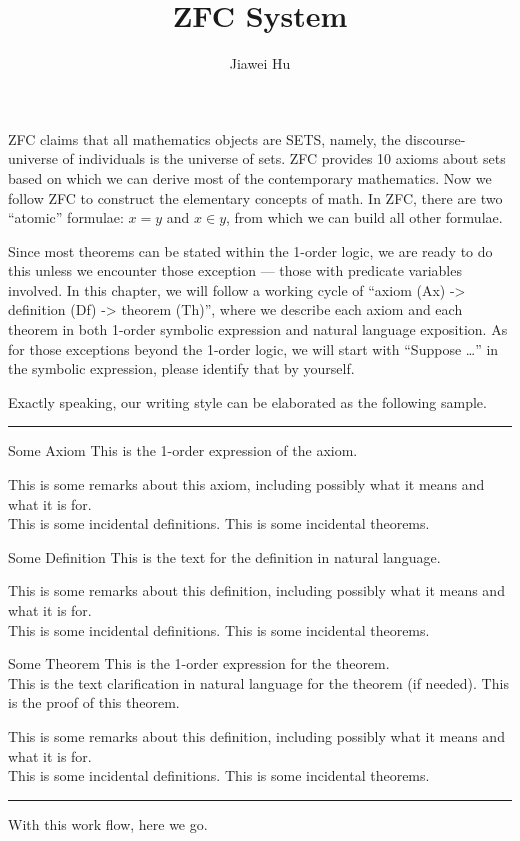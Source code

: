 \documentclass{article}
\title{\LARGE ZFC System}
\author{\large Jiawei Hu}
\begin{document}
\maketitle

ZFC claims that all mathematics objects are SETS, namely, the discourse-universe of individuals is the universe of sets. ZFC provides 10 axioms about sets based on which we can derive most of the contemporary mathematics. Now we follow ZFC to construct the elementary concepts of math.
In ZFC, there are two ``atomic'' formulae: $x=y$ and $x\in y$, from which we can build all other formulae.

Since most theorems can be stated within the 1-order logic, we are ready to do this unless we encounter those exception — those with predicate variables involved. In this chapter, we will follow a working cycle of ``axiom (Ax) -> definition (Df) -> theorem (Th)'', where we describe each axiom and each theorem in both 1-order symbolic expression and natural language exposition. As for those exceptions beyond the 1-order logic, we will start with ``Suppose \dots'' in the symbolic expression, please identify that by yourself.

Exactly speaking, our writing style can be elaborated as the following sample.\\
\noindent\rule{\textwidth}{1pt}
\begin{Ax}{Some Axiom}
    \textcolor{Ax}{This is the 1-order expression of the axiom.}
\end{Ax}
This is some remarks about this axiom, including possibly what it means and what it is for.\\
\textcolor{Df}{This is some incidental definitions.}
\textcolor{Th}{This is some incidental theorems.}

\begin{Df}{Some Definition}
    This is the text for the definition in natural language.
\end{Df}
This is some remarks about this definition, including possibly what it means and what it is for.\\
\textcolor{Df}{This is some incidental definitions.}
\textcolor{Th}{This is some incidental theorems.}

\begin{Th}{Some Theorem}
    \textcolor{Th}{This is the 1-order expression for the theorem.}\\
    This is the text clarification in natural language for the theorem (if needed).
    \tcblower
    This is the proof of this theorem.
\end{Th}
This is some remarks about this definition, including possibly what it means and what it is for.\\
\textcolor{Df}{This is some incidental definitions.}
\textcolor{Th}{This is some incidental theorems.}\\
\noindent\rule{\textwidth}{1pt}
With this work flow, here we go.
\end{document}
